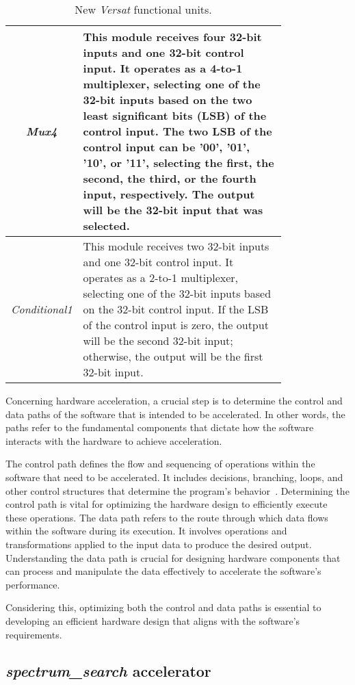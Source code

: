 \begin{table}[H]
\begin{tabular}{|c|p{0.8\linewidth}|}
        \hline
        \multirow{5}{*}{\textit{Mux4}} & This module receives four 32-bit inputs and one 32-bit control input. It operates as a 4-to-1 multiplexer, selecting one of the 32-bit inputs based on the two least significant bits (LSB) of the control input.  The two LSB of the control input can be '00', '01', '10', or '11', selecting the first, the second, the third, or the fourth input, respectively. The output will be the 32-bit input that was selected. \\
        \hline
        \multirow{4}{*}{\textit{Conditional1}} & This module receives two 32-bit inputs and one 32-bit control input. It operates as a 2-to-1 multiplexer, selecting one of the 32-bit inputs based on the 32-bit control input. If the LSB of the control input is zero, the output will be the second 32-bit input; otherwise, the output will be the first 32-bit input. \\
        \hline
    \end{tabular}
    \caption{New \textit{Versat} functional units.}
    \label{tab:fu}
\end{table}

\vspace{0.5cm}

Concerning hardware acceleration, a crucial step is to determine the control and data paths of the software that is intended to be accelerated. In other words, the paths refer to the fundamental components that dictate how the software interacts with the hardware to achieve acceleration.

The control path defines the flow and sequencing of operations within the software that need to be accelerated. It includes decisions, branching, loops, and other control structures that determine the program's behavior~\cite{datacontrolpath}. Determining the control path is vital for optimizing the hardware design to efficiently execute these operations.
The data path refers to the route through which data flows within the software during its execution. It involves operations and transformations applied to the input data to produce the desired output. Understanding the data path is crucial for designing hardware components that can process and manipulate the data effectively to accelerate the software's performance.

Considering this, optimizing both the control and data paths is essential to developing an efficient hardware design that aligns with the software's requirements.

\subsection{\textit{spectrum\_search} accelerator}


